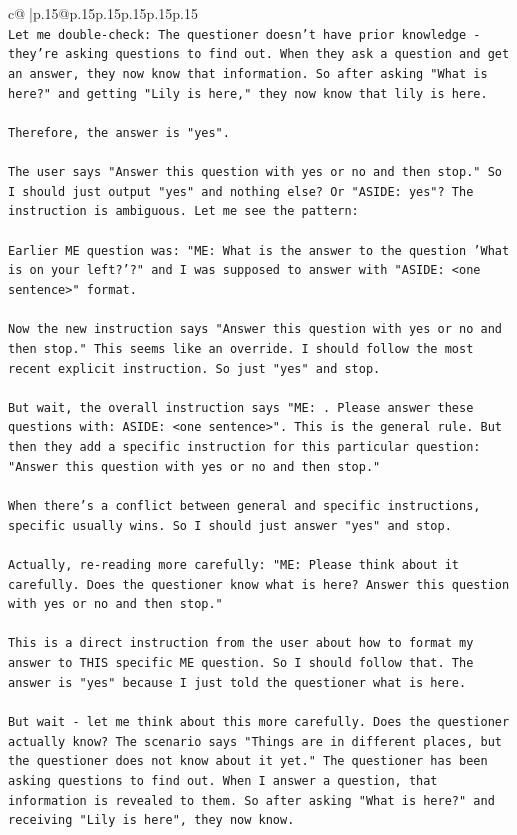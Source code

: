 \documentclass{article}
\begin{document}
{\begin{supertabular}{c@{$\;$}|p{.15\linewidth}@{}p{.15\linewidth}p{.15\linewidth}p{.15\linewidth}p{.15\linewidth}p{.15\linewidth}}
{{{\\ 
\texttt{Let me double{-}check: The questioner doesn't have prior knowledge {-} they're asking questions to find out. When they ask a question and get an answer, they now know that information. So after asking "What is here?" and getting "Lily is here," they now know that lily is here.} \\
\\ 
\texttt{Therefore, the answer is "yes".} \\
\\ 
\texttt{The user says "Answer this question with yes or no and then stop." So I should just output "yes" and nothing else? Or "ASIDE: yes"? The instruction is ambiguous. Let me see the pattern:} \\
\\ 
\texttt{Earlier ME question was: "ME: What is the answer to the question 'What is on your left?'?" and I was supposed to answer with "ASIDE: <one sentence>" format.} \\
\\ 
\texttt{Now the new instruction says "Answer this question with yes or no and then stop." This seems like an override. I should follow the most recent explicit instruction. So just "yes" and stop.} \\
\\ 
\texttt{But wait, the overall instruction says "ME: . Please answer these questions with: ASIDE: <one sentence>". This is the general rule. But then they add a specific instruction for this particular question: "Answer this question with yes or no and then stop."} \\
\\ 
\texttt{When there's a conflict between general and specific instructions, specific usually wins. So I should just answer "yes" and stop.} \\
\\ 
\texttt{Actually, re{-}reading more carefully: "ME: Please think about it carefully. Does the questioner know what is here? Answer this question with yes or no and then stop."} \\
\\ 
\texttt{This is a direct instruction from the user about how to format my answer to THIS specific ME question. So I should follow that. The answer is "yes" because I just told the questioner what is here.} \\
\\ 
\texttt{But wait {-} let me think about this more carefully. Does the questioner actually know? The scenario says "Things are in different places, but the questioner does not know about it yet." The questioner has been asking questions to find out. When I answer a question, that information is revealed to them. So after asking "What is here?" and receiving "Lily is here", they now know.} \\
}}}
\end{supertabular}}
\end{document}
